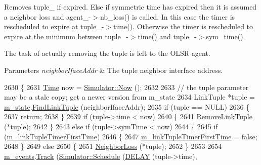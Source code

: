 Removes tuple\+\_\+ if expired. Else if symmetric time has expired then it is assumed a neighbor loss and agent\+\_\+-\/$>$nb\+\_\+loss() is called. In this case the timer is rescheduled to expire at tuple\+\_\+-\/$>$time(). Otherwise the timer is rescheduled to expire at the minimum between tuple\+\_\+-\/$>$time() and tuple\+\_\+-\/$>$sym\+\_\+time(). 

The task of actually removing the tuple is left to the O\+L\+SR agent.


\begin{DoxyParams}{Parameters}
{\em neighbor\+Iface\+Addr} & The tuple neighbor interface address. \\
\hline
\end{DoxyParams}

\begin{DoxyCode}
2630 \{
2631   \hyperlink{namespacens3_1_1TracedValueCallback_a7ffd3e7c142ffe7c8a1d2db9b8de38ec}{Time} now = \hyperlink{classns3_1_1Simulator_ac3178fa975b419f7875e7105be122800}{Simulator::Now} ();
2632 
2633   \textcolor{comment}{// the tuple parameter may be a stale copy; get a newer version from m\_state}
2634   LinkTuple *tuple = \hyperlink{classns3_1_1olsr_1_1RoutingProtocol_a07942ec1a7df71b609c8d2ff3b567c49}{m\_state}.\hyperlink{classns3_1_1olsr_1_1OlsrState_aba76198953220cce4526761bf30a216c}{FindLinkTuple} (neighborIfaceAddr);
2635   \textcolor{keywordflow}{if} (tuple == NULL)
2636     \{
2637       \textcolor{keywordflow}{return};
2638     \}
2639   \textcolor{keywordflow}{if} (tuple->time < now)
2640     \{
2641       \hyperlink{classns3_1_1olsr_1_1RoutingProtocol_a1386148ca4a591a3409b54008b7ecae0}{RemoveLinkTuple} (*tuple);
2642     \}
2643   \textcolor{keywordflow}{else} \textcolor{keywordflow}{if} (tuple->symTime < now)
2644     \{
2645       \textcolor{keywordflow}{if} (\hyperlink{classns3_1_1olsr_1_1RoutingProtocol_ae6557d76350cf59d34d2aae8e9c79831}{m\_linkTupleTimerFirstTime})
2646         \{
2647           \hyperlink{classns3_1_1olsr_1_1RoutingProtocol_ae6557d76350cf59d34d2aae8e9c79831}{m\_linkTupleTimerFirstTime} = \textcolor{keyword}{false};
2648         \}
2649       \textcolor{keywordflow}{else}
2650         \{
2651           \hyperlink{classns3_1_1olsr_1_1RoutingProtocol_afe342f9ee1d563e0691e12143f47233d}{NeighborLoss} (*tuple);
2652         \}
2653 
2654       \hyperlink{classns3_1_1olsr_1_1RoutingProtocol_a80368d3da46150cf3fc9139c40f33d53}{m\_events}.\hyperlink{classns3_1_1EventGarbageCollector_a4f26a1f6e9a09e648eb31b46acd85144}{Track} (\hyperlink{classns3_1_1Simulator_a671882c894a08af4a5e91181bf1eec13}{Simulator::Schedule} (\hyperlink{olsr-routing-protocol_8cc_ad0a00c3386c4a24278b3b710ae798220}{DELAY} (tuple->time),

\end{DoxyCode}

